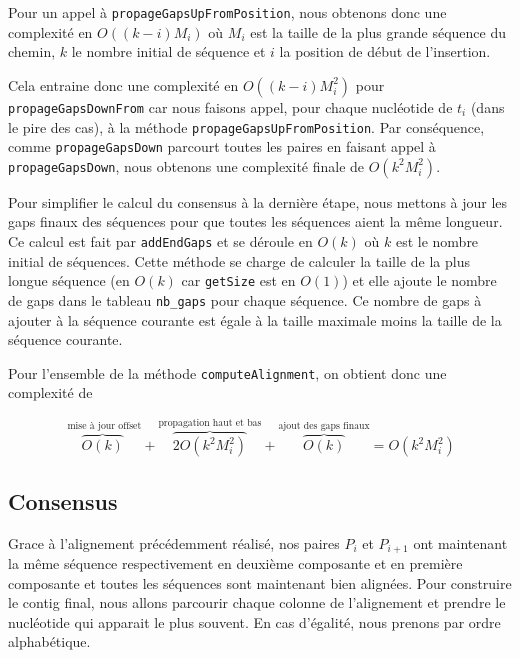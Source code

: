 Pour un appel à \verb|propageGapsUpFromPosition|, nous obtenons donc une
complexité en $O( (k - i) M_{i})$ où $M_{i}$ est la taille de la plus grande
séquence du chemin, $k$ le nombre initial de séquence et $i$ la position de
début de l'insertion.

Cela entraine donc une complexité en $O( (k - i) M_{i}^{2})$ pour
\verb|propageGapsDownFrom| car nous faisons appel, pour chaque nucléotide de
$t_{i}$ (dans le pire des cas), à la méthode \-\verb|propageGapsUpFromPosition|.
Par conséquence, comme \verb|propageGapsDown| parcourt toutes les paires en
faisant appel à \verb|propageGapsDown|, nous obtenons une complexité finale de
$O(k^{2} M_{i}^{2})$.

Pour simplifier le calcul du consensus à la dernière étape, nous mettons à jour
les gaps finaux des séquences pour que toutes les séquences aient la même
longueur. Ce calcul est fait par \verb|addEndGaps| et se déroule en $O(k)$ où
$k$ est le nombre initial de séquences. Cette méthode se charge de calculer la
taille de la plus longue séquence (en $O(k)$ car \verb|getSize| est en $O(1)$)
et elle ajoute le nombre de gaps dans le tableau \verb|nb_gaps| pour chaque
séquence. Ce nombre de gaps à ajouter à la séquence courante est égale à la
taille maximale moins la taille de la séquence courante.

Pour l'ensemble de la méthode \verb|computeAlignment|, on obtient donc une
complexité de

\begin{equation}
	\overbrace{O(k)}^{\text{ mise à jour offset}} + \overbrace{2 O(k^{2}
	M_{i}^{2})}^{\text{propagation haut et bas}} + \overbrace{O(k)}^{\text{ajout
	des gaps finaux}} = O(k^{2} M_{i}^{2})
\end{equation}


\subsection{Consensus}
\label{subsection:consensus}

Grace à l'alignement précédemment réalisé, nos paires $P_{i}$ et $P_{i + 1}$ ont
maintenant la même séquence respectivement en deuxième composante et en première
composante et toutes les séquences sont maintenant bien alignées. Pour
construire le contig final, nous allons parcourir chaque colonne de l'alignement
et prendre le nucléotide qui apparait le plus souvent. En cas d'égalité, nous
prenons par ordre alphabétique.

